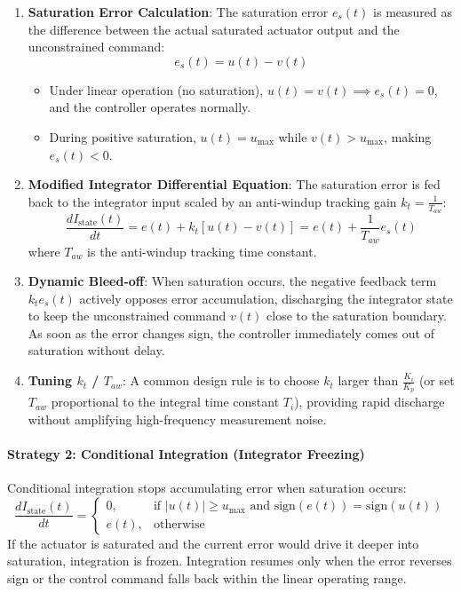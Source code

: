 \documentclass[12pt,onecolumn,twoside ]{article}
\begin{document}
	\begin{enumerate}
		\item
		\textbf{Saturation Error Calculation}: The saturation error $e_s(t)$ is measured as the difference between the actual saturated actuator output and the unconstrained command: \[
		e_s(t) = u(t) - v(t)
		\]
		\begin{itemize}
			\item
			Under linear operation (no saturation), $u(t) = v(t) \implies e_s(t) = 0$, and the controller operates normally.
			\item
			During positive saturation, $u(t) = u_{\max}$ while $v(t) > u_{\max}$, making $e_s(t) < 0$.
		\end{itemize}
		\item
		\textbf{Modified Integrator Differential Equation}: The saturation error is fed back to the integrator input scaled by an anti-windup tracking gain $k_t = \frac{1}{T_{aw}}$: \[
		\frac{d I_{\text{state}}(t)}{dt} = e(t) + k_t [u(t) - v(t)] = e(t) + \frac{1}{T_{aw}} e_s(t)
		\] where $T_{aw}$ is the anti-windup tracking time constant.
		\item
		\textbf{Dynamic Bleed-off}: When saturation occurs, the negative feedback term $k_t e_s(t)$ actively opposes error accumulation, discharging the integrator state to keep the unconstrained command $v(t)$ close to the saturation boundary. As soon as the error changes sign, the controller immediately comes out of saturation without delay.
		\item
		\textbf{Tuning $k_t$ / $T_{aw}$}: A common design rule is to choose $k_t$ larger than $\frac{K_i}{K_p}$ (or set $T_{aw}$ proportional to the integral time constant $T_i$), providing rapid discharge without amplifying high-frequency measurement noise.
	\end{enumerate}
	\paragraph{Strategy 2: Conditional Integration (Integrator Freezing)}
	Conditional integration stops accumulating error when saturation occurs: \[
	\frac{d I_{\text{state}}(t)}{dt} = \begin{cases} 0, & \text{if } |u(t)| \ge u_{\max} \text{ and } \text{sign}(e(t)) = \text{sign}(u(t)) \\ e(t), & \text{otherwise} \end{cases}
	\] If the actuator is saturated and the current error would drive it deeper into saturation, integration is frozen. Integration resumes only when the error reverses sign or the control command falls back within the linear operating range.
\end{document}
